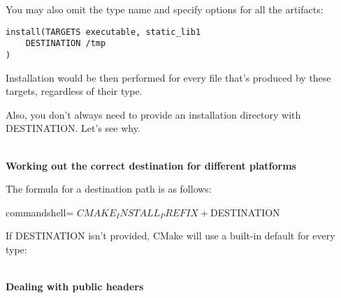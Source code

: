 You may also omit the type name and specify options for all the artifacts:

\begin{lstlisting}[style=styleCMake]
install(TARGETS executable, static_lib1
	DESTINATION /tmp
)
\end{lstlisting}

Installation would be then performed for every file that's produced by these targets, regardless of their type.

Also, you don't always need to provide an installation directory with DESTINATION. Let's see why.

\hspace*{\fill} \\ %
\noindent
\textbf{Working out the correct destination for different platforms}

The formula for a destination path is as follows:

\begin{tcblisting}{commandshell={}}
${CMAKE_INSTALL_PREFIX} + ${DESTINATION}
\end{tcblisting}

If DESTINATION isn't provided, CMake will use a built-in default for every type:



\hspace*{\fill} \\ %
\noindent
\textbf{Dealing with public headers}







